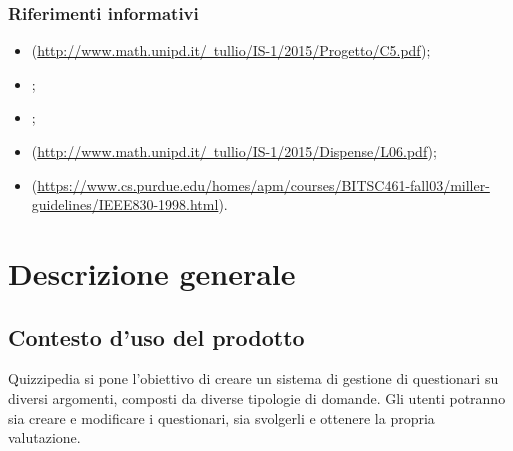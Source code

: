 \documentclass[a4paper, titlepage]{article}
\begin{document}
\subsubsection{Riferimenti informativi}
\begin{itemize}
\item {}  (\href{http://www.math.unipd.it/~tullio/IS-1/2015/Progetto/C5.pdf}{http://www.math.unipd.it/~tullio/IS-1/2015/Progetto/C5.pdf});

\item {} ;

\item {} ;

\item {}  (\href{http://www.math.unipd.it/~tullio/IS-1/2015/Dispense/L06.pdf}{http://www.math.unipd.it/~tullio/IS-1/2015/Dispense/L06.pdf});

\item {}  (\href{https://www.cs.purdue.edu/homes/apm/courses/BITSC461-fall03/miller-guidelines/IEEE830-1998.html}{https://www.cs.purdue.edu/homes/apm/courses/BITSC461-fall03/miller-guidelines/IEEE830-1998.html}).

\end{itemize}

\newpage

\section{Descrizione generale}
\subsection{Contesto d'uso del prodotto}
Quizzipedia si pone l'obiettivo di creare un sistema di gestione di questionari su diversi argomenti, composti da diverse tipologie di domande. Gli utenti potranno sia creare e modificare i questionari, sia svolgerli e ottenere la propria valutazione.
\end{document}
